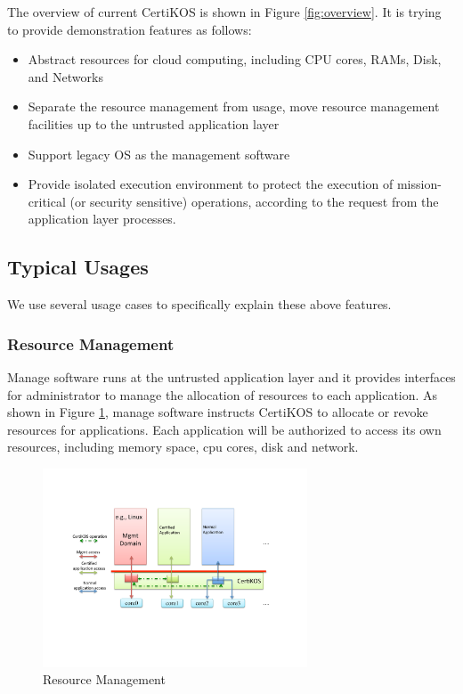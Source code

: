 \documentclass[a4paper,12pt]{article}
\begin{document}
The overview of current CertiKOS  is shown in Figure \ref{fig:overview}.  It is trying to provide demonstration features as follows:
\begin{itemize}
\item  Abstract resources for cloud computing, including CPU cores, RAMs, Disk, and Networks
\item  Separate the resource management from usage, move resource management facilities up to the untrusted application layer
\item  Support legacy OS as the management software
\item  Provide isolated execution environment to protect the execution of mission-critical (or security sensitive) operations,  according to the request from the application layer processes.
\end{itemize}

\subsection{Typical Usages }
We use several usage cases to specifically explain these above features.

\subsubsection{Resource Management}
Manage software runs at the untrusted application layer and it provides interfaces for administrator to manage the allocation of resources to each application.  As shown in Figure \ref{fig:resourcemgmt}, manage software instructs  CertiKOS to allocate  or revoke resources for applications.   Each application will be authorized to access its own resources, including memory space, cpu cores, disk and network.
\begin{figure}[!ht]
 \centerline{
 \includegraphics[width=0.7\textwidth]{certikos_resource_mgmt}}
 \caption{Resource Management} \label{fig:resourcemgmt}
\end{figure}
\end{document}
